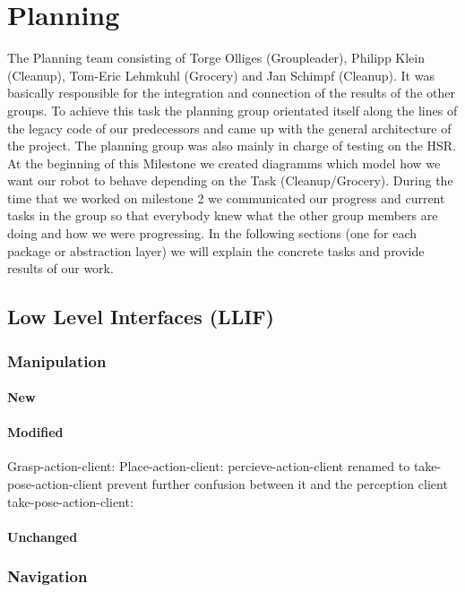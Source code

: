 \documentclass[main.tex]{subfiles}
\begin{document}
	
	\chapter{Planning}
                The Planning team consisting of Torge Olliges (Groupleader), Philipp Klein (Cleanup), Tom-Eric Lehmkuhl (Grocery) and Jan Schimpf (Cleanup). It was basically responsible for the integration and connection of the results of the other groups. To achieve this task the planning group orientated itself along the lines of the legacy code of our predecessors and came up with the general architecture of the project. The planning group was also mainly in charge of testing on the HSR. At the beginning of this Milestone we created diagramms which model how we want our robot to behave depending on the Task (Cleanup/Grocery). During the time that we worked on milestone 2 we communicated our progress and current tasks in the group so that everybody knew what the other group members are doing and how we were progressing. In the following sections (one for each package or abstraction layer) we will explain the concrete tasks and provide results of our work.
                \section{Low Level Interfaces (LLIF)}
                \subsection{Manipulation}
                \subsubsection{New}
                \subsubsection{Modified}
                Grasp-action-client:
                Place-action-client:
                percieve-action-client renamed to take-pose-action-client prevent further confusion between it and the perception client
                take-pose-action-client:
                \subsubsection{Unchanged}
                \subsection{Navigation}
\end{document}
